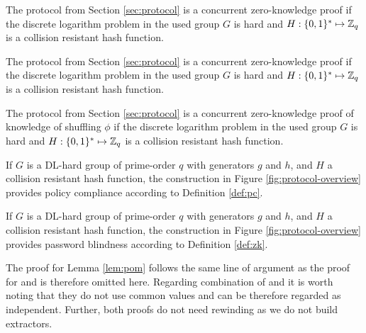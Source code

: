 \begin{lemma}\label{lem:poc}
  The \PoC protocol from Section \ref{sec:protocol} is a concurrent zero-knowledge proof if the discrete logarithm problem in the used group $G$ is hard and $H:\{0,1\}^\ast\mapsto\mathbb{Z}_q$ is a collision resistant hash function.
\end{lemma}

\begin{lemma}\label{lem:pom}
  The \PoM protocol from Section \ref{sec:protocol} is a concurrent zero-knowledge proof if the discrete logarithm problem in the used group $G$ is hard and $H:\{0,1\}^\ast\mapsto\mathbb{Z}_q$ is a collision resistant hash function.
\end{lemma}

\begin{lemma}\label{lem:pos}
  The \PoS protocol from Section \ref{sec:protocol} is a concurrent zero-knowledge proof of knowledge of shuffling $\phi$ if the discrete logarithm problem in the used group $G$ is hard and $H:\{0,1\}^\ast\mapsto\mathbb{Z}_q$ is a collision resistant hash function.
\end{lemma}


\begin{theorem}\label{theo:pc}
  If $G$ is a DL-hard group of prime-order $q$ with generators $g$ and $h$, and $H$ a collision resistant hash function, the construction in Figure \ref{fig:protocol-overview} provides policy compliance according to Definition \ref{def:pc}.
\end{theorem}

%
\begin{theorem}\label{theo:zk}
  If $G$ is a DL-hard group of prime-order $q$ with generators $g$ and $h$, and $H$ a collision resistant hash function, the construction in Figure \ref{fig:protocol-overview} provides password blindness according to Definition \ref{def:zk}.
\end{theorem}


The proof for Lemma \ref{lem:pom} follows the same line of argument as the proof for \PoC and is therefore omitted here.
Regarding combination of \PoC and \PoM it is worth noting that they do not use common values and can be therefore regarded as independent.
Further, both proofs do not need rewinding as we do not build extractors.

